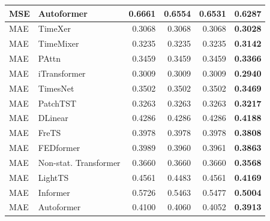 \begin{longtable}{llrrrr}
MSE & Autoformer & 0.6661 & 0.6554 & 0.6531 & \textbf{0.6287} \\
\midrule
MAE & TimeXer & 0.3068 & 0.3068 & 0.3068 & \textbf{0.3028} \\
MAE & TimeMixer & 0.3235 & 0.3235 & 0.3235 & \textbf{0.3142} \\
MAE & PAttn & 0.3459 & 0.3459 & 0.3459 & \textbf{0.3366} \\
MAE & iTransformer & 0.3009 & 0.3009 & 0.3009 & \textbf{0.2940} \\
MAE & TimesNet & 0.3502 & 0.3502 & 0.3502 & \textbf{0.3469} \\
MAE & PatchTST & 0.3263 & 0.3263 & 0.3263 & \textbf{0.3217} \\
MAE & DLinear & 0.4286 & 0.4286 & 0.4286 & \textbf{0.4188} \\
MAE & FreTS & 0.3978 & 0.3978 & 0.3978 & \textbf{0.3808} \\
MAE & FEDformer & 0.3989 & 0.3960 & 0.3961 & \textbf{0.3863} \\
MAE & Non-stat. Transformer & 0.3660 & 0.3660 & 0.3660 & \textbf{0.3568} \\
MAE & LightTS & 0.4561 & 0.4483 & 0.4561 & \textbf{0.4169} \\
MAE & Informer & 0.5726 & 0.5463 & 0.5477 & \textbf{0.5004} \\
MAE & Autoformer & 0.4100 & 0.4060 & 0.4052 & \textbf{0.3913} \\
\end{longtable}
\endgroup

